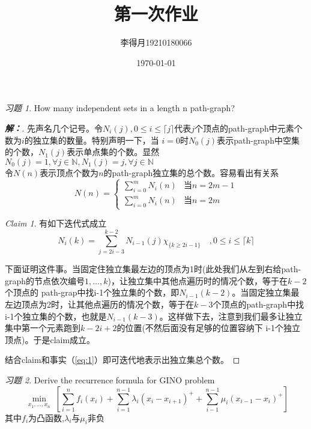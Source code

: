 \documentclass{article}
\title{第一次作业}
\author{李得月19210180066}
\date{\today}
\newenvironment{solution}{\begin{proof}[\indent\bf 解：]}{\end{proof}}
\theoremstyle{remark}
\newtheorem{exc}{习题}
\newtheorem*{claim}{Claim}
\begin{document}
\maketitle
\begin{exc}
    How many independent sets in a length n path-graph?
\end{exc}
\begin{solution}
    先声名几个记号。令$N_i(j) , 0\leq i \leq \lceil j \rceil$代表$j$个顶点的path-graph中元素个数为$i$的独立集的数量。特别声明一下，当
    $i=0$时$N_0(j)$表示path-graph中空集的个数，$N_1(j)$表示单点集的个数。显然$N_0(j) = 1 ,\forall j \in \mathbb{N} ,N_1(j) = j ,\forall j \in \mathbb{N} $\\
    令$N(n)$表示顶点个数为$n$的path-graph独立集的总个数。容易看出有关系
    \begin{equation}\label{eq:1}
        N(n) = 
    \begin{cases}
        \sum _{i=0}^m N_i(n) &当 n=2m-1 \\
        \sum _{i=0}^m N_i(n) &当 n=2m
    \end{cases}
    \end{equation}
    
    \begin{claim}
        有如下迭代式成立\[N_i(k) = \sum_{j=2i-3}^{k-2} N_{i-1}(j)\chi_{\{ k\geq 2i-1\} }
        \quad ,0\leq i \leq \lceil k \rceil
        \]
    \end{claim}
    下面证明这件事。当固定住独立集最左边的顶点为1时(此处我们从左到右给path-graph的节点依次编号$1,\ldots,k$)，让独立集中其他点遍历时的情况个数，等于在$k-2$个顶点的
    path-grap中找i-1个独立集的个数，即$N_{i-1}(k-2)$。当固定独立集最左边顶点为2时，让其他点遍历的情况个数，等于在$k-3$个顶点的path-graph中找
    i-1个独立集的个数，也就是$N_{i-1}(k-3)$。这样做下去，注意到我们最多让独立集中第一个元素跑到$k-2i+2$的位置(不然后面没有足够的位置容纳下
    i-1个独立顶点)。于是claim成立。
    
    结合claim和事实（\ref{eq:1}）即可迭代地表示出独立集总个数。
\end{solution}
\begin{exc}
    Derive the recurrence formula for GINO problem
    \[\min_{\substack{x_1,\ldots,x_n}} \left[
    \sum_{i=1}^n f_i(x_i) +
    \sum_{i=1}^{n-1} \lambda_i(x_i-x_{i+1})^{+} +
    \sum_{i-1}^{n-1} \mu_i(x_{i-1}-x_i)^{+}
    \right]
    \]
    其中$f_i$为凸函数,$\lambda_i$与$\mu_i$非负
\end{exc}
\end{document}
